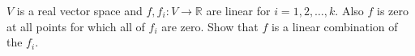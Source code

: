 \(V\) is a real vector space and \( f,  f_{i}\colon  V \to \mathbb{R} \) are linear for \(i = 1, 2, \dots , k.\)  Also \(f \) is zero at all points for which all of \( f_{i }\) are zero. Show that \( f \) is a linear combination of the \(f_{i}\).